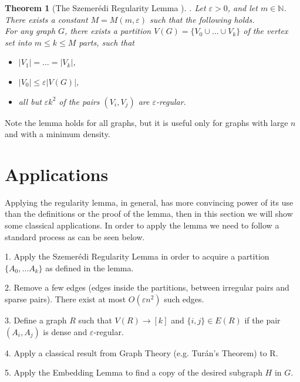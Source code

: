 \documentclass[12pt,twoside,a4paper,bibliography=totocnumbered]{book}
\numberwithin{equation}{section}
\newtheorem{theorem}             {Theorem}[section]
\theoremstyle{remark}
\begin{document}
\begin{theorem}[{The Szemerédi Regularity Lemma \cite{Sz75}}]. Let $\varepsilon > 0$, and let $m \in  \mathbb{N}$. There exists a constant $M=M(m,\varepsilon)$ such that the following holds.\\
For any graph $G$, there exists a partition $V(G) = \{V_0 \cup \ldots \cup V_k\}$ of the vertex set into $m \leq k \leq M$ parts, such that
\begin{itemize}

	\item $|V_1| = \ldots =|V_k|$,
	
	\item $|V_0| \leq \varepsilon|V(G)|$,
	\item all but $\varepsilon k^2$ of the pairs $(V_i, V_j)$ are $\varepsilon$-regular. 
\end{itemize}
\end{theorem}

Note the lemma holds for all graphs, but it is useful only for graphs with large $n$ and with a minimum density.%

\section{Applications}
Applying the regularity lemma, in general, has more convincing power of its use than the definitions or the proof of the lemma, then in this section we will show some classical applications. In order to apply the lemma we need to follow a standard process as can be seen below.

1. Apply the Szemerédi Regularity Lemma in order to acquire a partition $ \{ A_0, \ldots A_k \} $ as defined in the lemma.

2. Remove a few edges (edges inside the partitions, between irregular pairs and sparse pairs). There exist at most $O(\varepsilon n^2)$ such edges.

3. Define a graph $R$ such that $V(R) \rightarrow [k]$ and $\{i,j\} \in E(R) $ if  the pair $(A_i, A_j)$ is dense and $\varepsilon$-regular.

4. Apply a classical result from Graph Theory (e.g. Turán's Theorem) to R.

5. Apply the Embedding Lemma to find a copy of the desired subgraph $H$ in $G$.
\end{document}
